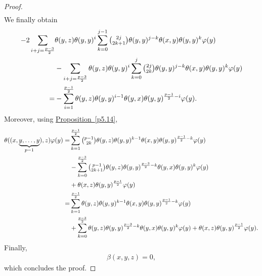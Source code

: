 \documentclass[11pt, twoside]{article}
\begin{document}
\begin{proof}
\begin{align*}
    \end{align*} We finally obtain \begin{align*}
        -2 \sum\limits_{i+j=\frac{p-3}{2}}&\theta(y,z)\theta(y,y)^i\sum\limits_{k=0}^{j-1}\tbinom{2j}{2k+1}\theta(y,y)^{j-k}\theta(x,y)\theta(y,y)^{k}\varphi(y) \\ & -\sum\limits_{i+j=\frac{p-3}{2}}\theta(y,z)\theta(y,y)^i\sum\limits_{k=0}^j\tbinom{2j}{2k}\theta(y,y)^{j-k}\theta(x,y)\theta(y,y)^{k}\varphi(y)\\ =& -\sum\limits_{i=1}^{\frac{p-1}{2}}\theta(y,z)\theta(y,y)^{i-1}\theta(y,x)\theta(y,y)^{\frac{p-1}{2}-i}\varphi(y).
    \end{align*} Moreover, using \hyperref[p5.14]{Proposition~\ref*{p5.14}}, \begin{align*}
        \theta((x,\underbrace{y,\ldots,y}_{p-1}),z)\varphi(y)=& \sum\limits_{k=1}^{\frac{p-1}{2}}\tbinom{p-1}{2k}\theta(y,z)\theta(y,y)^{k-1}\theta(x,y)\theta(y,y)^{\frac{p-1}{2}-k}\varphi(y)\\&- \sum\limits_{k=0}^{\frac{p-3}{2}}\tbinom{p-1}{2k+1}\theta(y,z)\theta(y,y)^{\frac{p-3}{2}-k}\theta(y,x)\theta(y,y)^k\varphi(y)\\&+\theta(x,z)\theta(y,y)^\frac{p-1}{2}\varphi(y)\\=& \sum\limits_{k=1}^{\frac{p-1}{2}}\theta(y,z)\theta(y,y)^{k-1}\theta(x,y)\theta(y,y)^{\frac{p-1}{2}-k}\varphi(y)\\&+ \sum\limits_{k=0}^{\frac{p-3}{2}}\theta(y,z)\theta(y,y)^{\frac{p-3}{2}-k}\theta(y,x)\theta(y,y)^k\varphi(y)+\theta(x,z)\theta(y,y)^\frac{p-1}{2}\varphi(y).
    \end{align*} Finally, \begin{align*}
        \beta(x,y,z)= 0,
    \end{align*} which concludes the proof.    
\end{proof}
\end{document}
